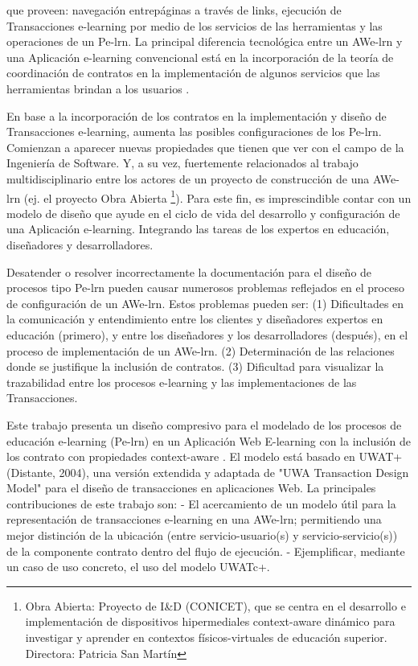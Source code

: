 que proveen:  navegación entrepáginas a través de links, ejecución de Transacciones  e-learning por medio de los servicios de las herramientas y las operaciones de un Pe-lrn. La principal diferencia tecnológica entre un AWe-lrn y una Aplicación e-learning convencional está en la incorporación de la teoría de coordinación de contratos \cite{fiadeiro,libro5} en la implementación de algunos servicios que las herramientas brindan a los usuarios \cite{libro}.

En base a la incorporación de los contratos en la implementación y diseño de Transacciones e-learning, aumenta las posibles configuraciones de los Pe-lrn. Comienzan a aparecer nuevas propiedades que  tienen que ver con el campo de la Ingeniería de Software. Y, a su vez,  fuertemente relacionados al trabajo multidisciplinario entre los actores de un proyecto de construcción de una AWe-lrn (ej. el proyecto Obra Abierta \footnote{Obra Abierta: Proyecto de I&D (CONICET), que se centra en el desarrollo e implementación de dispositivos hipermediales context-aware dinámico para investigar y aprender en contextos físicos-virtuales de educación superior. Directora: Patricia San Martín }). Para este fin, es imprescindible contar con un modelo de diseño que ayude en el ciclo de vida del desarrollo y configuración de una Aplicación e-learning. Integrando las tareas de los expertos en educación, diseñadores y desarrolladores. 

Desatender o resolver incorrectamente la documentación para el diseño de
procesos tipo Pe-lrn pueden causar numerosos problemas reflejados en el proceso
de configuración  de un AWe-lrn. Estos problemas pueden ser: (1) Dificultades en
la comunicación y entendimiento entre los clientes y diseñadores expertos en
educación (primero), y entre los diseñadores y los desarrolladores (después), en
el proceso de implementación de un AWe-lrn. (2) Determinación de las relaciones
donde se justifique la inclusión de contratos. (3) Dificultad para visualizar la
trazabilidad entre los procesos e-learning y las implementaciones de las
Transacciones.

Este trabajo presenta un diseño compresivo para el modelado de los procesos de
educación e-learning (Pe-lrn) en un Aplicación Web E-learning con la inclusión
de los contrato con propiedades context-aware \cite{libro}. El modelo está
basado en UWAT+ (Distante, 2004), una versión extendida y adaptada de "UWA
Transaction Design Model" para el diseño de transacciones en aplicaciones Web.
La principales contribuciones de este trabajo son: - El acercamiento de un
modelo útil para la representación de transacciones e-learning en una AWe-lrn;
permitiendo una mejor distinción de la ubicación (entre servicio-usuario(s) y
servicio-servicio(s)) de la componente contrato dentro del flujo de ejecución. -
Ejemplificar, mediante un caso de uso concreto,  el uso del modelo UWATc+.


